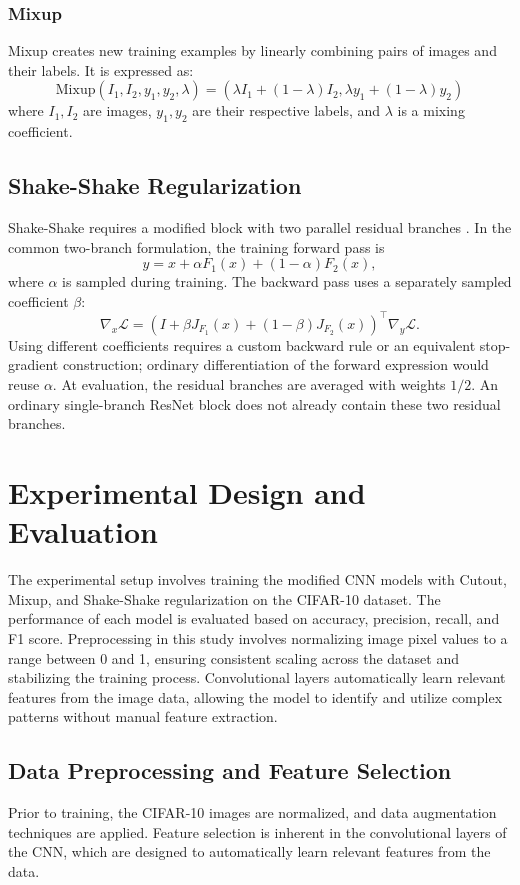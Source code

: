\documentclass[12pt]{article}
\begin{document}
\subsubsection{Mixup}
Mixup creates new training examples by linearly combining pairs of images and their labels. It is expressed as:
\begin{equation}
  \text{Mixup}(I_1, I_2, y_1, y_2, \lambda) = (\lambda I_1 + (1 - \lambda) I_2, \lambda y_1 + (1 - \lambda) y_2)
\end{equation}
where \(I_1, I_2\) are images, \(y_1, y_2\) are their respective labels, and \(\lambda\) is a mixing coefficient.

\subsection{Shake-Shake Regularization}
Shake-Shake requires a modified block with two parallel residual branches
\cite{gastaldi2017shake}. In the common two-branch formulation, the training
forward pass is
\[
 y=x+\alpha F_1(x)+(1-\alpha)F_2(x),
\]
where \(\alpha\) is sampled during training. The backward pass uses a separately
sampled coefficient \(\beta\):
\[
 \nabla_x\mathcal{L}
 =\left(I+\beta J_{F_1}(x)+(1-\beta)J_{F_2}(x)\right)^\top\nabla_y\mathcal{L}.
\]
Using different coefficients requires a custom backward rule or an equivalent
stop-gradient construction; ordinary differentiation of the forward expression
would reuse \(\alpha\). At evaluation, the residual branches are averaged with
weights \(1/2\). An ordinary single-branch ResNet block does not already contain
these two residual branches.

\section{Experimental Design and Evaluation}
The experimental setup involves training the modified CNN models with Cutout, Mixup, and Shake-Shake regularization on the CIFAR-10 dataset. The performance of each model is evaluated based on accuracy, precision, recall, and F1 score. Preprocessing in this study involves normalizing image pixel values to a range between 0 and 1, ensuring consistent scaling across the dataset and stabilizing the training process. Convolutional layers automatically learn relevant features from the image data, allowing the model to identify and utilize complex patterns without manual feature extraction.

\subsection{Data Preprocessing and Feature Selection}
Prior to training, the CIFAR-10 images are normalized, and data augmentation techniques are applied. Feature selection is inherent in the convolutional layers of the CNN, which are designed to automatically learn relevant features from the data.
\end{document}
